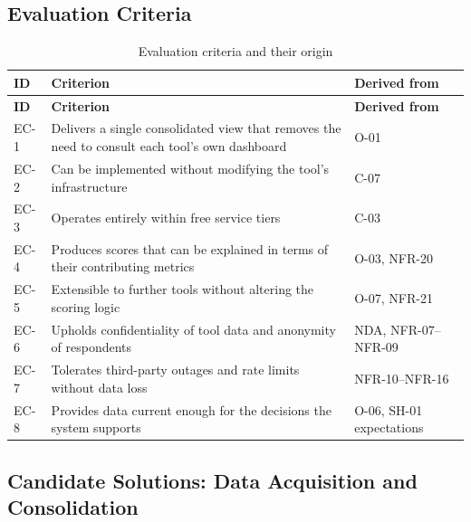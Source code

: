 \subsection{Evaluation Criteria}\label{subsec:evaluation-criteria}
\begin{longtable}{
  >{\raggedright\arraybackslash}p{}  >{\raggedright\arraybackslash}p{}
  >{\raggedright\arraybackslash}p{}}
\caption{Evaluation criteria and their origin}\label{tab:criteria}\\
\toprule\textbf{ID} & \textbf{Criterion} & \textbf{Derived from} \\
\midrule\endfirsthead
\toprule\textbf{ID} & \textbf{Criterion} & \textbf{Derived from} \\
\midrule\endhead
\bottomrule\endlastfoot
EC-1 & Delivers a single consolidated view that removes the need to consult each tool's own dashboard & O-01 \\
\addlinespace EC-2 & Can be implemented without modifying the tool's infrastructure & C-07 \\
\addlinespace EC-3 & Operates entirely within free service tiers & C-03 \\
\addlinespace EC-4 & Produces scores that can be explained in terms of their contributing metrics &
O-03, NFR-20 \\\addlinespace
EC-5 & Extensible to further tools without altering the scoring logic & O-07, NFR-21\\
\addlinespace EC-6 & Upholds confidentiality of tool data and anonymity of respondents & NDA,
NFR-07--NFR-09 \\\addlinespace
EC-7 & Tolerates third-party outages and rate limits without data loss &NFR-10--NFR-16 \\
\addlinespace EC-8 & Provides data current enough for the decisions the system supports & O-06,
SH-01 expectations \\\end{longtable}
\subsection{Candidate Solutions: Data Acquisition and Consolidation}
\label{subsec:primary-candidates}
